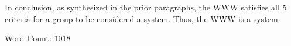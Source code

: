 \documentclass[11pt]{article}
\begin{document}
\par In conclusion, as synthesized in the prior paragraphs, the WWW satisfies all 5 criteria for a group to be considered a system. Thus, the WWW is a system.
\par
\par Word Count: 1018



































	





	








\end{document}
